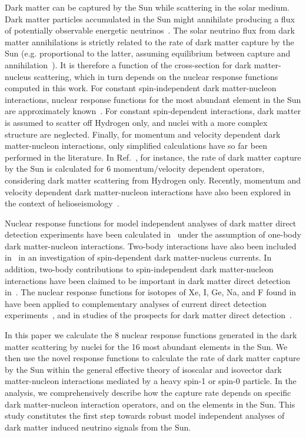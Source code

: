 \documentclass[11pt,a4paper]{article}
\begin{document}
Dark matter can be captured by the Sun while scattering in the solar medium. Dark matter particles accumulated in the Sun might annihilate producing a flux of potentially observable energetic neutrinos~\cite{Edsjo:1997hp}. The solar neutrino flux from dark matter annihilations is strictly related to the rate of dark matter capture by the Sun (e.g. proportional to the latter, assuming equilibrium between capture and annihilation~\cite{Edsjo:1997hp}). It is therefore a function of the cross-section for dark matter-nucleus scattering, which in turn depends on the nuclear response functions computed in this work. For constant spin-independent dark matter-nucleon interactions, nuclear response functions for the most abundant element in the Sun are approximately known~\cite{Gondolo:2004sc}. For constant spin-dependent interactions, dark matter is assumed to scatter off Hydrogen only, and nuclei with a more complex structure are neglected. Finally, for momentum and velocity dependent dark matter-nucleon interactions, only simplified calculations have so far been performed in the literature. In Ref.~\cite{Liang:2013dsa}, for instance, the rate of dark matter capture by the Sun is calculated for 6 momentum/velocity dependent operators, considering dark matter scattering from Hydrogen only. Recently, momentum and velocity dependent dark matter-nucleon interactions have also been explored in the context of helioseismology~\cite{Vincent:2013lua,Lopes:2014aoa,Vincent:2014jia}.

Nuclear response functions for model independent analyses of dark matter direct detection experiments have been calculated in~\cite{Vietze:2014vsa,Fitzpatrick:2012ix} under the assumption of one-body dark matter-nucleon interactions. Two-body interactions have also been included in~\cite{Klos:2013rwa,Menendez:2012tm} in an investigation of spin-dependent dark matter-nucleus currents. In addition, two-body contributions to spin-independent dark matter-nucleon interactions have been claimed to be important in dark matter direct detection in~\cite{Prezeau:2003sv,Cirigliano:2013zta,Cirigliano:2012pq}. The nuclear response functions for isotopes of Xe, I, Ge, Na, and F found in~\cite{Fitzpatrick:2012ix} have been applied to complementary analyses of current direct detection experiments~\cite{Catena:2014uqa,Gresham:2014vja,DelNobile:2013sia}, and in studies of the prospects for dark matter direct detection~\cite{Catena:2014epa,Catena:2014hla}. 

In this paper we calculate the 8 nuclear response functions generated in the dark matter scattering by nuclei for the 16 most abundant elements in the Sun. We then use the novel response functions to calculate the rate of dark matter capture by the Sun within the general effective theory of isoscalar and isovector dark matter-nucleon interactions mediated by a heavy spin-1 or spin-0 particle. In the analysis, we comprehensively describe how the capture rate depends on specific dark matter-nucleon interaction operators, and on the elements in the Sun. This study constitutes the first step towards robust model independent analyses of dark matter induced neutrino signals from the Sun.
\end{document}
